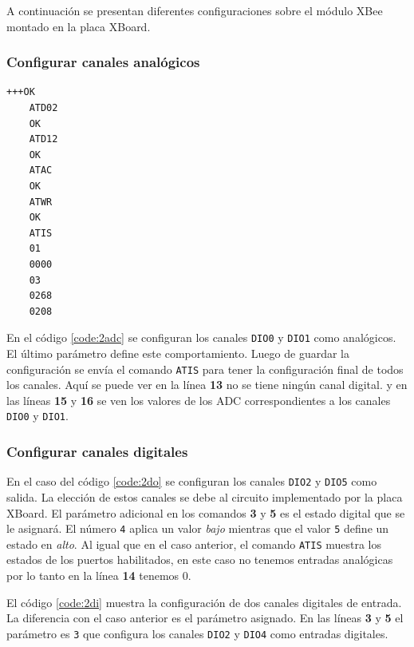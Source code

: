 \documentclass[11pt,oneside,spanish,a4paper]{article}
\begin{document}
A continuación se presentan diferentes configuraciones sobre el módulo
XBee montado en la placa XBoard.

\subsubsection{Configurar canales analógicos}

\noindent\begin{minipage}{.35\textwidth}
\begin{lstlisting}[emph={+++,ATIS,ATD02,ATD12,ATWR,ATAC},
    emphstyle={\color{blue}},caption={Canales analógicos.},label=code:2adc]
    +++OK
    ATD02
    OK
    ATD12
    OK
    ATAC
    OK
    ATWR
    OK
    ATIS
    01
    0000
    03
    0268
    0208
\end{lstlisting}  
\end{minipage}\hfill
\begin{minipage}{.60\textwidth}
En el código \ref{code:2adc} se configuran los canales \texttt{DIO0}
y \texttt{DIO1} como analógicos. El último parámetro define este
comportamiento. Luego de guardar la configuración se envía el comando
\texttt{ATIS} para tener la configuración final de todos los
canales. Aquí se puede ver en la línea \textbf{13} no se tiene ningún
canal digital. y en las líneas \textbf{15} y \textbf{16} se ven los
valores de los ADC correspondientes a los canales \texttt{DIO0} y
\texttt{DIO1}.
\end{minipage}

\subsubsection{Configurar canales digitales}
En el caso del código \ref{code:2do} se configuran los canales
\texttt{DIO2} y \texttt{DIO5} como salida. La elección de estos
canales se debe al circuito implementado por la placa XBoard. El
parámetro adicional en los comandos \textbf{3} y \textbf{5} es el
estado digital que se le asignará. El número \texttt{4} aplica un
valor \emph{bajo} mientras que el valor \texttt{5} define un estado
en \emph{alto}.  Al igual que en el caso anterior, el comando
\texttt{ATIS} muestra los estados de los puertos habilitados, en este
caso no tenemos entradas analógicas por lo tanto en la línea
\textbf{14} tenemos 0. 

El código \ref{code:2di}  muestra la configuración de dos canales
digitales de entrada. La diferencia con el caso anterior es el
parámetro asignado. En las líneas \textbf{3} y \textbf{5} el parámetro
es \texttt{3} que configura los canales \texttt{DIO2} y \texttt{DIO4}
como entradas digitales. 
\end{document}
